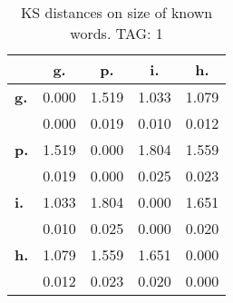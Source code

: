 \begin{table}[h!]
\begin{center}
\begin{tabular}{| l || c | c | c | c |}\hline
 & {\bf g.} & {\bf p.} & {\bf i.} & {\bf h.} \\\hline\hline
{\bf g.} & 0.000 & 1.519 & 1.033 & 1.079 \\
{\bf } & 0.000 & 0.019 & 0.010 & 0.012 \\\hline
{\bf p.} & 1.519 & 0.000 & 1.804 & 1.559 \\
{\bf } & 0.019 & 0.000 & 0.025 & 0.023 \\\hline
{\bf i.} & 1.033 & 1.804 & 0.000 & 1.651 \\
{\bf } & 0.010 & 0.025 & 0.000 & 0.020 \\\hline
{\bf h.} & 1.079 & 1.559 & 1.651 & 0.000 \\
{\bf } & 0.012 & 0.023 & 0.020 & 0.000 \\\hline
\end{tabular}
\caption{KS distances on size of known words. TAG: 1}
\end{center}
\end{table}